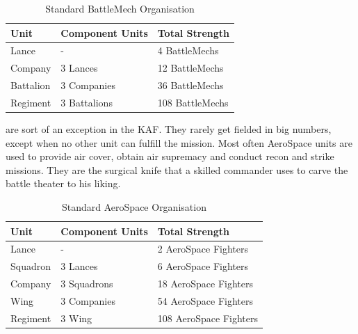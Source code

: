 \documentclass{tufte-book}
\begin{document}
\bigskip
\begin{table}
\begin{minipage}{\textwidth}
\begin{center}
\begin{tabular}{lll}
\toprule
Unit & Component Units & Total Strength \\
\midrule
Lance     & -            & 4 BattleMechs \\
Company   & 3 Lances     & 12 BattleMechs \\
Battalion & 3 Companies  & 36 BattleMechs \\
Regiment  & 3 Battalions & 108 BattleMechs \\
\bottomrule
\end{tabular}
\end{center}
\end{minipage}
\caption{Standard BattleMech Organisation}
\end{table}

 are sort of an exception in the KAF. 
They rarely get fielded in big numbers, except when no other unit can
fulfill the mission. Most often AeroSpace units are used to provide air
cover, obtain air supremacy and conduct recon and strike missions. They
are the surgical knife that a skilled commander uses to carve the battle
theater to his liking.

\bigskip
\begin{table}
\begin{minipage}{\textwidth}
\begin{center}
\begin{tabular}{lll}
\toprule
Unit & Component Units & Total Strength \\
\midrule
Lance    & -           & 2 AeroSpace Fighters \\
Squadron & 3 Lances    & 6 AeroSpace Fighters \\
Company  & 3 Squadrons & 18 AeroSpace Fighters \\
Wing     & 3 Companies & 54 AeroSpace Fighters \\
Regiment & 3 Wing      & 108 AeroSpace Fighters \\
\bottomrule
\end{tabular}
\end{center}
\end{minipage}
\caption{Standard AeroSpace Organisation}
\end{table}
\end{document}
